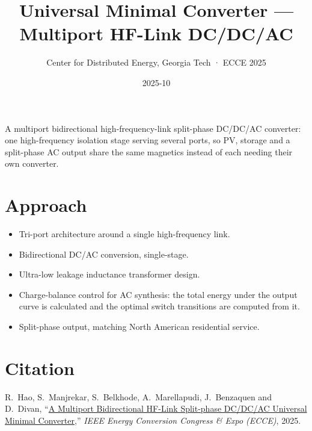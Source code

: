 \title{Universal Minimal Converter --- Multiport HF-Link DC/DC/AC}
\subtitle{Center for Distributed Energy, Georgia Tech · ECCE 2025}
\date{2025-10}




A multiport bidirectional high-frequency-link split-phase DC/DC/AC converter:
one high-frequency isolation stage serving several ports, so PV, storage and a
split-phase AC output share the same magnetics instead of each needing their
own converter.

\section{Approach}

\begin{itemize}
  \item Tri-port architecture around a single high-frequency link.
  \item Bidirectional DC/AC conversion, single-stage.
  \item Ultra-low leakage inductance transformer design.
  \item Charge-balance control for AC synthesis: the total energy under the output curve is calculated and the optimal switch transitions are computed from it.
  \item Split-phase output, matching North American residential service.
\end{itemize}

\section{Citation}

R.~Hao, S.~Manjrekar, S.~Belkhode, A.~Marellapudi, J.~Benzaquen and D.~Divan,
``\href{https://doi.org/10.1109/ECCE58356.2025.11259542}{A Multiport
Bidirectional HF-Link Split-phase DC/DC/AC Universal Minimal Converter},''
\textit{IEEE Energy Conversion Congress \& Expo (ECCE)}, 2025.


